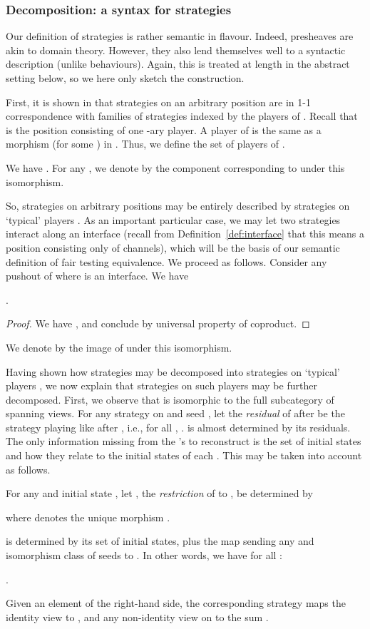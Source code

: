 \documentclass{LMCS}
\theoremstyle{plain}\newtheorem{satz}[thm]{Satz}
\begin{document}
\subsubsection{Decomposition: a syntax for strategies}\label{subsubsec:syntax}
Our definition of strategies is rather semantic in flavour. Indeed,
presheaves are akin to domain theory. However, they also lend
themselves well to a syntactic description (unlike behaviours). Again,
this is treated at length in the abstract setting below, so we here
only sketch the construction.

First, it is shown in  that strategies on an arbitrary position 
are in 1-1 correspondence with families of strategies indexed by the
players of . Recall that  is the position consisting of one
-ary player. A player of  is the same as a morphism 
(for some ) in . Thus, we define the set  of players of .
\begin{prop}
We have  . For any , we denote by  the component corresponding
to  under this isomorphism.
\end{prop}
So, strategies on arbitrary positions may be entirely described by
strategies on `typical' players . As an important particular
case, we may let two strategies interact along an interface (recall
from Definition~\ref{def:interface} that this means a position
consisting only of channels), which will be the basis of our semantic
definition of fair testing equivalence. We proceed as follows.
Consider any pushout  of  where  is an
interface. We have
\begin{cor}
  .
\end{cor}
\begin{proof}
  We have , and conclude by universal
  property of coproduct.
\end{proof}
We denote by  the image of  under
this isomorphism.

Having shown how strategies may be decomposed into strategies on
`typical' players , we now explain that strategies on such
players may be further decomposed. First, we observe that 
is isomorphic to the full subcategory  of 
spanning views.  For any strategy  on  and seed , let the \emph{residual}  of  after  be
the strategy playing like  after , i.e., for all , .  is almost
determined by its residuals. The only information missing from the
's to reconstruct  is the set of initial states and how
they relate to the initial states of each . This may be
taken into account as follows.

\begin{defi}\label{def:restriction}
  For any  and initial state , let ,
   the \emph{restriction} of  to , be determined by

where  denotes the unique morphism .
\end{defi}
 is determined by its set  of initial
states, plus the map  sending any  and isomorphism class 
of seeds to . In other words, we have
for all :
\begin{thm}
   .
\end{thm}
Given an element  of the right-hand side, the
corresponding strategy maps the identity view  to , and any
non-identity view  on  to the sum .
\end{document}
